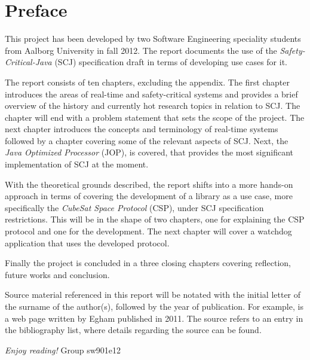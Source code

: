 \newpage
\thispagestyle{empty}
\mbox{}

\chapter*{Preface}
This project has been developed by two Software Engineering speciality students from Aalborg University in fall 2012. The report documents the use of the \textit{Safety-Critical-Java} (SCJ) specification draft in terms of developing use cases for it.

\vspace{4mm}
\noindent The report consists of ten chapters, excluding the appendix. The first chapter introduces the areas of real-time and safety-critical systems and provides a brief overview of the history and currently hot research topics in relation to SCJ. The chapter will end with a problem statement that sets the scope of the project. The next chapter introduces the concepts and terminology of real-time systems followed by a chapter covering some of the relevant aspects of SCJ. Next, the \textit{Java Optimized Processor} (JOP), is covered, that provides the most significant implementation of SCJ at the moment.

With the theoretical grounds described, the report shifts into a more hands-on approach in terms of covering the development of a library as a use case, more specifically the \textit{CubeSat Space Protocol} (CSP), under SCJ specification restrictions. This will be in the shape of two chapters, one for explaining the CSP protocol and one for the development. The next chapter will cover a watchdog application that uses the developed protocol.

Finally the project is concluded in a three closing chapters covering reflection, future works and conclusion. 

\vspace{4mm}
\noindent Source material referenced in this report will be notated with the initial letter of the surname of the author(s), followed by the year of publication. For example, is a web page written by Egham published in 2011. The source refers to an entry in the bibliography list, where details regarding the source can be found.

\vspace{5mm}
	\begin{flushright}
\emph{Enjoy reading!} Group sw901e12
	\end{flushright}

\newpage
